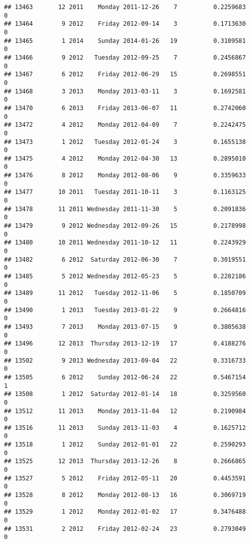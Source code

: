 \documentclass[
]{article}
\begin{document}
\begin{verbatim}
## 13463       12 2011    Monday 2011-12-26    7          0.2259683             0
## 13464        9 2012    Friday 2012-09-14    3          0.1713630             0
## 13465        1 2014    Sunday 2014-01-26   19          0.3109581             0
## 13466        9 2012   Tuesday 2012-09-25    7          0.2456867             0
## 13467        6 2012    Friday 2012-06-29   15          0.2698551             0
## 13468        3 2013    Monday 2013-03-11    3          0.1692581             0
## 13470        6 2013    Friday 2013-06-07   11          0.2742060             0
## 13472        4 2012    Monday 2012-04-09    7          0.2242475             0
## 13473        1 2012   Tuesday 2012-01-24    3          0.1655138             0
## 13475        4 2012    Monday 2012-04-30   13          0.2895010             0
## 13476        8 2012    Monday 2012-08-06    9          0.3359633             0
## 13477       10 2011   Tuesday 2011-10-11    3          0.1163125             0
## 13478       11 2011 Wednesday 2011-11-30    5          0.2091836             0
## 13479        9 2012 Wednesday 2012-09-26   15          0.2178998             0
## 13480       10 2011 Wednesday 2011-10-12   11          0.2243929             0
## 13482        6 2012  Saturday 2012-06-30    7          0.3019551             0
## 13485        5 2012 Wednesday 2012-05-23    5          0.2282186             0
## 13489       11 2012   Tuesday 2012-11-06    5          0.1850709             0
## 13490        1 2013   Tuesday 2013-01-22    9          0.2664816             0
## 13493        7 2013    Monday 2013-07-15    9          0.3805638             0
## 13496       12 2013  Thursday 2013-12-19   17          0.4188276             0
## 13502        9 2013 Wednesday 2013-09-04   22          0.3316733             0
## 13505        6 2012    Sunday 2012-06-24   22          0.5467154             1
## 13508        1 2012  Saturday 2012-01-14   18          0.3259560             0
## 13512       11 2013    Monday 2013-11-04   12          0.2190984             0
## 13516       11 2013    Sunday 2013-11-03    4          0.1625712             0
## 13518        1 2012    Sunday 2012-01-01   22          0.2590293             0
## 13525       12 2013  Thursday 2013-12-26    8          0.2666865             0
## 13527        5 2012    Friday 2012-05-11   20          0.4453591             0
## 13528        8 2012    Monday 2012-08-13   16          0.3069719             0
## 13529        1 2012    Monday 2012-01-02   17          0.3476488             0
## 13531        2 2012    Friday 2012-02-24   23          0.2793049             0

\end{verbatim}
\end{document}
